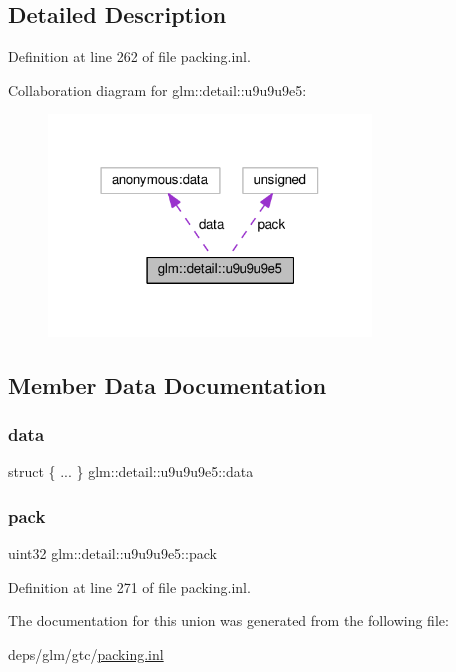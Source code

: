 \subsection{Detailed Description}


Definition at line 262 of file packing.\+inl.



Collaboration diagram for glm\+:\+:detail\+:\+:u9u9u9e5\+:
\nopagebreak
\begin{figure}[H]
\begin{center}
\leavevmode
\includegraphics[width=243pt]{d9/dec/unionglm_1_1detail_1_1u9u9u9e5__coll__graph}
\end{center}
\end{figure}


\subsection{Member Data Documentation}
\mbox{\label{unionglm_1_1detail_1_1u9u9u9e5_aec3cfb9113fe5fda39fef08bf4b46a72}} 
\subsubsection{\texorpdfstring{data}{data}}
{\footnotesize\ttfamily struct \{ ... \}   glm\+::detail\+::u9u9u9e5\+::data}

\mbox{\label{unionglm_1_1detail_1_1u9u9u9e5_a76c0b28299b57da27b9e023091ae9c32}} 
\subsubsection{\texorpdfstring{pack}{pack}}
{\footnotesize\ttfamily uint32 glm\+::detail\+::u9u9u9e5\+::pack}



Definition at line 271 of file packing.\+inl.



The documentation for this union was generated from the following file\+:\begin{DoxyCompactItemize}
\item 
deps/glm/gtc/\hyperlink{packing_8inl}{packing.\+inl}\end{DoxyCompactItemize}
